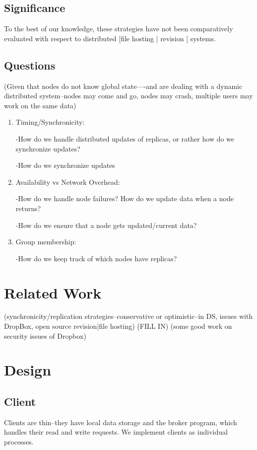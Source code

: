 \subsection{Significance}
To the best of our knowledge, these strategies have not been comparatively evaluated with respect to distributed [file hosting | revision ] systems.

\subsection{Questions}
(Given that nodes do not know global state----and are dealing with a dynamic distributed system--nodes may come and go, nodes may crash, multiple users may work on the same data)
\begin{enumerate}
\item Timing/Synchronicity:

-How do we handle distributed updates of replicas, or rather how do we synchronize updates?

-How do we synchronize updates

\item Availability vs Network Overhead:

-How do we handle node failures?  How do we update data when a node returns?

-How do we ensure that a node gets updated/current data?

\item Group membership:

-How do we keep track of which nodes have replicas?
\end{enumerate}

\section{Related Work}
(synchronicity/replication strategies--conservative or optimistic--in DS, issues with DropBox, open source revision|file hosting)
(FILL IN)
(some good work on security issues of Dropbox)

\section{Design}
\subsection{Client}
Clients are thin--they have local data storage and the broker program, which handles their read and write requests.
We implement clients as individual processes.
